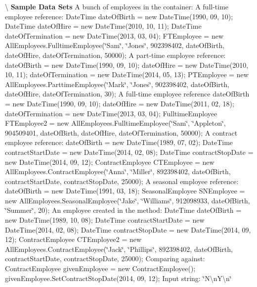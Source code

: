 \textbackslash{} {\bfseries  Sample Data Sets} A bunch of employees in the container\+: A full-\/time employee reference\+: Date\+Time date\+Of\+Birth = new Date\+Time(1990, 09, 10); Date\+Time date\+Of\+Hire = new Date\+Time(2010, 10, 11); Date\+Time date\+Of\+Termination = new Date\+Time(2013, 03, 04); F\+T\+Employee = new All\+Employees.\+Fulltime\+Employee(\char`\"{}\+Sam\char`\"{}, \char`\"{}\+Jones\char`\"{}, 902398402, date\+Of\+Birth, date\+Of\+Hire, date\+Of\+Termination, 50000); A part-\/time employee reference\+: date\+Of\+Birth = new Date\+Time(1990, 09, 10); date\+Of\+Hire = new Date\+Time(2010, 10, 11); date\+Of\+Termination = new Date\+Time(2014, 05, 13); P\+T\+Employee = new All\+Employees.\+Parttime\+Employee(\char`\"{}\+Mark\char`\"{}, \char`\"{}\+Jones\char`\"{}, 902398402, date\+Of\+Birth, date\+Of\+Hire, date\+Of\+Termination, 30); A full-\/time employee reference date\+Of\+Birth = new Date\+Time(1990, 09, 10); date\+Of\+Hire = new Date\+Time(2011, 02, 18); date\+Of\+Termination = new Date\+Time(2013, 03, 04); Fulltime\+Employee F\+T\+Employee2 = new All\+Employees.\+Fulltime\+Employee(\char`\"{}\+Sam\char`\"{}, \char`\"{}\+Appleton\char`\"{}, 904509401, date\+Of\+Birth, date\+Of\+Hire, date\+Of\+Termination, 50000); A contract employee reference\+: date\+Of\+Birth = new Date\+Time(1989, 07, 02); Date\+Time contract\+Start\+Date = new Date\+Time(2014, 02, 08); Date\+Time contract\+Stop\+Date = new Date\+Time(2014, 09, 12); Contract\+Employee C\+T\+Employee = new All\+Employees.\+Contract\+Employee(\char`\"{}\+Anna\char`\"{}, \char`\"{}\+Miller\char`\"{}, 892398402, date\+Of\+Birth, contract\+Start\+Date, contract\+Stop\+Date, 25000); A seasonal employee reference\+: date\+Of\+Birth = new Date\+Time(1991, 03, 18); Seasonal\+Employee S\+N\+Employee = new All\+Employees.\+Seasonal\+Employee(\char`\"{}\+Jake\char`\"{}, \char`\"{}\+Williams\char`\"{}, 912098933, date\+Of\+Birth, \char`\"{}\+Summer\char`\"{}, 20); An employee created in the method\+: Date\+Time date\+Of\+Birth = new Date\+Time(1989, 10, 08); Date\+Time contract\+Start\+Date = new Date\+Time(2014, 02, 08); Date\+Time contract\+Stop\+Date = new Date\+Time(2014, 09, 12); Contract\+Employee C\+T\+Employee2 = new All\+Employees.\+Contract\+Employee(\char`\"{}\+Jack\char`\"{}, \char`\"{}\+Phillips\char`\"{}, 892398402, date\+Of\+Birth, contract\+Start\+Date, contract\+Stop\+Date, 25000); Comparing against\+: Contract\+Employee given\+Employee = new Contract\+Employee(); given\+Employee.\+Set\+Contract\+Stop\+Date(2014, 09, 12); Input string\+: \char`\"{}\+N\textbackslash{}n\+Y\textbackslash{}n\char`\"{}

